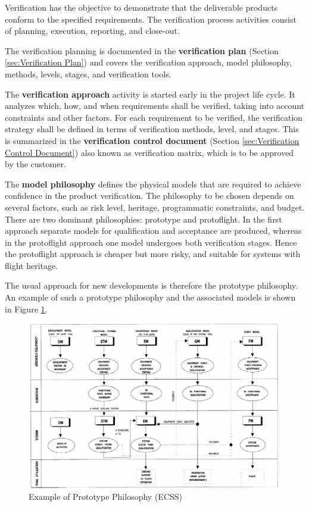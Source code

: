 Verification has the objective to demonstrate that the deliverable products conform to the specified requirements. The verification process activities consist of planning, execution, reporting, and close-out. 

The verification planning is documented in the \textbf{verification plan} (Section \ref{sec:Verification Plan}) and covers the verification approach, model philosophy, methods, levels, stages, and verification tools. 

The \textbf{verification approach} activity is started early in the project life cycle. It analyzes which, how, and when requirements shall be verified, taking into account constraints and other factors. For each requirement to be verified, the verification strategy shall be defined in terms of verification methods, level, and stages. This is summarized in the \textbf{verification control document} (Section \ref{sec:Verification Control Document}) also known as verification matrix, which is to be approved by the customer.

The \textbf{model philosophy} defines the physical models that are required to achieve confidence in the product verification. The philosophy to be chosen depends on several factors, such as risk level, heritage, programmatic constraints, and budget. There are two dominant philosophies: prototype and protoflight. In the first approach separate models for qualification and acceptance are produced, whereas in the protoflight approach one model undergoes both verification stages. Hence the protoflight approach is cheaper but more risky, and suitable for systems with flight heritage.

The usual approach for new developments is therefore the prototype philosophy. An example of such a prototype philosophy and the associated models is shown in Figure \ref{fig:Example of Prototype Philosophy}.

\begin{figure}[h]
\centering\includegraphics[scale=0.4]{fig/example_of_prototype_philosophy}
\caption{Example of Prototype Philosophy (ECSS)}
\label{fig:Example of Prototype Philosophy}
\end{figure}

